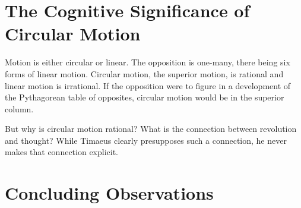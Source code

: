 
\section{The Cognitive Significance of Circular Motion} %
\label{sec:the_cognitive_significance_of_circular_motion}

Motion is either circular or linear. The opposition is one-many, there being six forms of linear motion. Circular motion, the superior motion, is rational and linear motion is irrational. If the opposition were to figure in a development of the Pythagorean table of opposites, circular motion would be in the superior column. 

But why is circular motion rational? What is the connection between revolution and thought? While Timaeus clearly presupposes such a connection, he never makes that connection explicit. 


\section{Concluding Observations} %
\label{sec:concluding_observations_cr}




